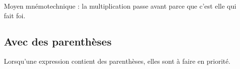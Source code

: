 Moyen mnémotechnique : la multiplication passe avant parce que c'est elle qui fait foi.

\subsection{Avec des parenthèses}

\begin{Aretenir}
    Lorsqu'une expression contient des parenthèses, elles sont à faire en priorité.
\end{Aretenir}

